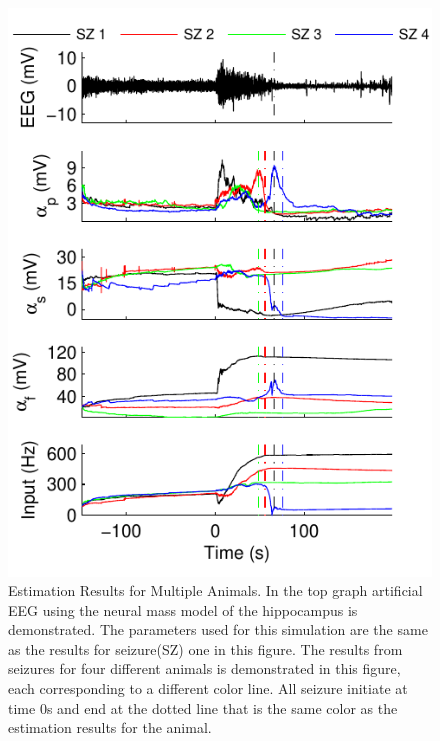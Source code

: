 \documentclass[10pt]{article}%
\begin{document}
\begin{figure}
 	\centering
 		\includegraphics{fig/SeizureComparison.pdf}
 	\caption{Estimation Results for Multiple Animals. In the top graph artificial EEG using the neural mass model of the hippocampus is demonstrated. The parameters used for this simulation are the same as the results for seizure(SZ) one in this figure. The results from seizures for four different animals is demonstrated in this figure, each corresponding to a different color line. All seizure initiate at time 0s and end at the dotted line that is the same color as the estimation results for the animal.}
 	\label{fig: SZComp}
 \end{figure}
\end{document}
